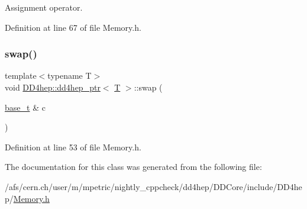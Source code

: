 Assignment operator. 



Definition at line 67 of file Memory.\+h.

\hypertarget{class_d_d4hep_1_1dd4hep__ptr_a9545ee3f6465afeefd98336c176529dd}{}\label{class_d_d4hep_1_1dd4hep__ptr_a9545ee3f6465afeefd98336c176529dd} 
\subsubsection{\texorpdfstring{swap()}{swap()}}
{\footnotesize\ttfamily template$<$typename T$>$ \\
void \hyperlink{class_d_d4hep_1_1dd4hep__ptr}{D\+D4hep\+::dd4hep\+\_\+ptr}$<$ \hyperlink{class_t}{T} $>$\+::swap (\begin{DoxyParamCaption}\item[{\hyperlink{class_d_d4hep_1_1dd4hep__ptr_a4bcbed2d2a920d0a5ffbf405263fe8d6}{base\+\_\+t} \&}]{c }\end{DoxyParamCaption})\hspace{0.3cm}{\ttfamily [inline]}}



Definition at line 53 of file Memory.\+h.



The documentation for this class was generated from the following file\+:\begin{DoxyCompactItemize}
\item 
/afs/cern.\+ch/user/m/mpetric/nightly\+\_\+cppcheck/dd4hep/\+D\+D\+Core/include/\+D\+D4hep/\hyperlink{_memory_8h}{Memory.\+h}\end{DoxyCompactItemize}
